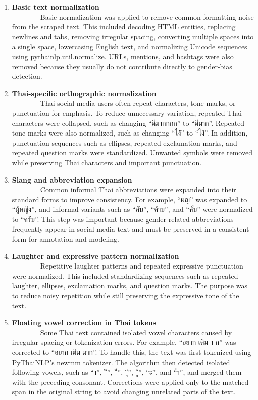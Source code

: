 \documentclass[12pt,oneside,openright,a4paper]{cpe-english-project}
\begin{document}
\begin{enumerate}
\item
  {\textbf{Basic text normalization}\\
  ~~~~~~~~Basic normalization was applied to remove common formatting noise from the scraped text. This included decoding HTML entities, replacing newlines and tabs, removing irregular spacing, converting multiple spaces into a single space, lowercasing English text, and normalizing Unicode sequences using pythainlp.util.normalize. URLs, mentions, and hashtags were also removed because they usually do not contribute directly to gender-bias detection.}
\item
  {\textbf{Thai-specific orthographic normalization}\\
  ~~~~~~~~Thai social media users often repeat characters, tone marks, or punctuation for emphasis. To reduce unnecessary variation, repeated Thai characters were collapsed, such as changing “ดีมากกกก” to “ดีมาก”. Repeated tone marks were also normalized, such as changing “ไง้้้้” to “ไง้”. In addition, punctuation sequences such as ellipses, repeated exclamation marks, and repeated question marks were standardized. Unwanted symbols were removed while preserving Thai characters and important punctuation.}
\item
  {\textbf{Slang and abbreviation expansion}\\
  ~~~~~~~~Common informal Thai abbreviations were expanded into their standard forms to improve consistency. For example, “ผญ” was expanded to “ผู้หญิง”, and informal variants such as “คับ”, “ค้าบ”, and “คั้บ” were normalized to “ครับ”. This step was important because gender-related abbreviations frequently appear in social media text and must be preserved in a consistent form for annotation and modeling.}
\item
  {\textbf{Laughter and expressive pattern normalization}\\
  ~~~~~~~~Repetitive laughter patterns and repeated expressive punctuation were normalized. This included standardizing sequences such as repeated laughter, ellipses, exclamation marks, and question marks. The purpose was to reduce noisy repetition while still preserving the expressive tone of the text.}
\item
  {\textbf{Floating vowel correction in Thai tokens}\\
  ~~~~~~~~Some Thai text contained isolated vowel characters caused by irregular spacing or tokenization errors. For example, “อยาก เติม า ก” was corrected to “อยาก เติม มาก”. To handle this, the text was first tokenized using PyThaiNLP's newmm tokenizer. The algorithm then detected isolated following vowels, such as “า”, “ิ”, “ี”, “ุ”, “ู”, “ะ”, and “ำ”, and merged them with the preceding consonant. Corrections were applied only to the matched span in the original string to avoid changing unrelated parts of the text.}

\end{enumerate}
\end{document}
